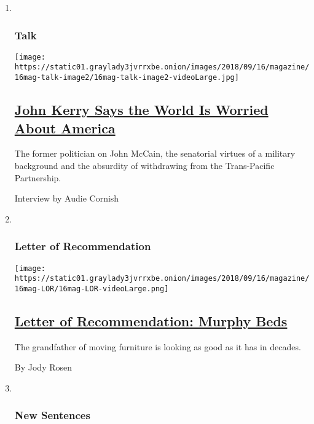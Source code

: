 \begin{enumerate}
\def\labelenumi{\arabic{enumi}.}
\item ~
  \hypertarget{talk}{%
  \subsubsection{Talk}\label{talk}}

  \texttt{[image: https://static01.graylady3jvrrxbe.onion/images/2018/09/16/magazine/16mag-talk-image2/16mag-talk-image2-videoLarge.jpg]}

  \hypertarget{john-kerry-says-the-world-is-worried-about-america}{%
  \subsection{\texorpdfstring{\href{/2018/09/12/magazine/john-kerry-says-the-world-is-worried-about-america.html}{John
  Kerry Says the World Is Worried About
  America}}{John Kerry Says the World Is Worried About America}}\label{john-kerry-says-the-world-is-worried-about-america}}

  The former politician on John McCain, the senatorial virtues of a
  military background and the absurdity of withdrawing from the
  Trans-Pacific Partnership.

  Interview by Audie Cornish
\item ~
  \hypertarget{letter-of-recommendation}{%
  \subsubsection{Letter of
  Recommendation}\label{letter-of-recommendation}}

  \texttt{[image: https://static01.graylady3jvrrxbe.onion/images/2018/09/16/magazine/16mag-LOR/16mag-LOR-videoLarge.png]}

  \hypertarget{letter-of-recommendation-murphy-beds}{%
  \subsection{\texorpdfstring{\href{/2018/09/13/magazine/letter-of-recommendation-murphy-beds.html}{Letter
  of Recommendation: Murphy
  Beds}}{Letter of Recommendation: Murphy Beds}}\label{letter-of-recommendation-murphy-beds}}

  The grandfather of moving furniture is looking as good as it has in
  decades.

  By Jody Rosen
\item ~
  \hypertarget{new-sentences}{%
  \subsubsection{New Sentences}\label{new-sentences}}


\end{enumerate}
